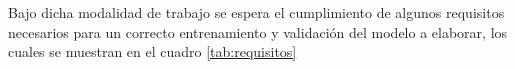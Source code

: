 Bajo dicha modalidad de trabajo se espera el cumplimiento de algunos requisitos necesarios para un correcto entrenamiento y validación del modelo a elaborar, los cuales se muestran en el cuadro \ref{tab:requisitos}

